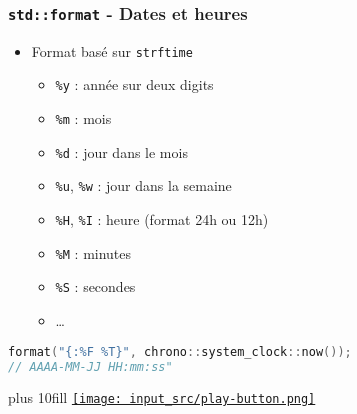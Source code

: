 \documentclass[C++.tex]{subfiles}
\begin{document}
\begin{frame}[fragile]
	\frametitle{\lstinline|std::format| - Dates et heures}
	\begin{itemize}
		\item Format basé sur \lstinline|strftime|
		\begin{itemize}
			\item \lstinline|%y| : année sur deux digits
			\item \lstinline|%m| : mois
			\item \lstinline|%d| : jour dans le mois
			\item \lstinline|%u|, \lstinline|%w| : jour dans la semaine


			\item \lstinline|%H|, \lstinline|%I| : heure (format 24h ou 12h)
			\item \lstinline|%M| : minutes
			\item \lstinline|%S| : secondes
			\item \ldots
		\end{itemize}
	\end{itemize}

	\begin{lstlisting}[language=C++]
format("{:%F %T}", chrono::system_clock::now());
// AAAA-MM-JJ HH:mm:ss"\end{lstlisting}

	\vskip 10mm plus 10fill
	\hfill
	\href{https://godbolt.org/#g:!((g:!((g:!((h:codeEditor,i:(filename:'1',fontScale:14,fontUsePx:'0',j:1,lang:c%2B%2B,selection:(endColumn:1,endLineNumber:9,positionColumn:1,positionLineNumber:9,selectionStartColumn:1,selectionStartLineNumber:1,startColumn:1,startLineNumber:1),source:'%23include+%3Ciostream%3E%0A%23include+%3Cchrono%3E%0A%23include+%3Cformat%3E%0A%0Aint+main()%0A%7B%0A++std::cout+%3C%3C+std::format(%22%7B:%25F+%25T%7D%22,+std::chrono::system_clock::now())%3B%0A%7D%0A'),l:'5',n:'0',o:'C%2B%2B+source+%231',t:'0')),k:50,l:'4',n:'0',o:'',s:0,t:'0'),(g:!((h:executor,i:(argsPanelShown:'1',compilationPanelShown:'0',compiler:gsnapshot,compilerName:'',compilerOutShown:'0',execArgs:'',execStdin:'',fontScale:14,fontUsePx:'0',j:1,lang:c%2B%2B,libs:!((name:boost,ver:'175')),options:'-std%3Dc%2B%2B20+-Wall+-Wextra+-pedantic',source:1,stdinPanelShown:'1',tree:'1',wrap:'0'),l:'5',n:'0',o:'Executor+x86-64+gcc+(trunk)+(C%2B%2B,+Editor+%231)',t:'0')),header:(),k:50,l:'4',n:'0',o:'',s:0,t:'0')),l:'2',n:'0',o:'',t:'0')),version:4}{\texttt{[image: input\_src/play-button.png]}}
\end{frame}
\end{document}
